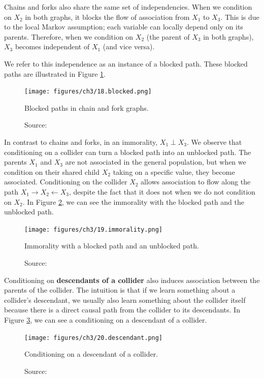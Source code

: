 Chains and forks also share the same set of independencies.
When we condition on \(X_2\) in both graphs,
it blocks the flow of association from \(X_1\) to \(X_3\).
This is due to the local Markov assumption; each variable can locally
depend only on its parents. Therefore, when we condition
on \(X_2\) (the parent of \(X_3\) in both graphs), \(X_3\)
becomes independent of \(X_1\) (and vice versa).

We refer to this independence as an instance of a blocked path.
These blocked paths are illustrated in Figure \ref{fig:blocked_paths}.

\begin{figure}[h]
    \centering
    \texttt{[image: figures/ch3/18.blocked.png]}
    \caption{Blocked paths in chain and fork graphs.}
    \vspace{-10px}
    \caption*{\scriptsize{Source: \cite{Neal_2020a}}}
    \label{fig:blocked_paths}
\end{figure}

In contrast to chains and forks, in an immorality, \(X_1 \perp X_3\).
We observe that conditioning on a collider can turn a blocked path
into an unblocked path. The parents \(X_1\) and \(X_3\)
are not associated in the general population, but when we condition
on their shared child \(X_2\) taking on a specific value,
they become associated. Conditioning on the collider \(X_2\)
allows association to flow along the path
\(X_1 \rightarrow X_2 \leftarrow X_3\), despite the fact that it
does not when we do not condition on \(X_2\).
In Figure \ref{fig:immorality}, we can see the immorality with
the blocked path and the unblocked path.

\begin{figure}[h]
    \centering
    \texttt{[image: figures/ch3/19.immorality.png]}
    \caption{Immorality with a blocked path and an unblocked path.}
    \vspace{-10px}
    \caption*{\scriptsize{Source: \cite{Neal_2020a}}}
    \label{fig:immorality}
\end{figure}

Conditioning on \textbf{descendants of a collider} also induces
association between the parents of the collider.
The intuition is that if we learn something about a collider's descendant,
we usually also learn something about the collider itself because there
is a direct causal path from the collider to its descendants.
In Figure \ref{fig:descendants}, we can see a conditioning
on a descendant of a collider.

\begin{figure}[h]
    \centering
    \texttt{[image: figures/ch3/20.descendant.png]}
    \caption{Conditioning on a descendant of a collider.}
    \vspace{-10px}
    \caption*{\scriptsize{Source: \cite{Neal_2020a}}}
    \label{fig:descendants}
\end{figure}

